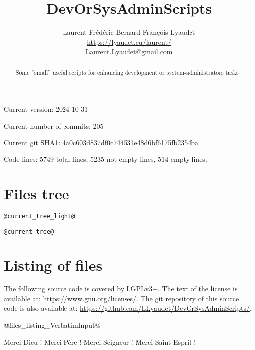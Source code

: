 \documentclass{article}
\begin{document}
\author{
  Laurent Frédéric Bernard François Lyaudet\\
  \url{https://lyaudet.eu/laurent/}\\
  \href{mailto:Laurent.Lyaudet@gmail.com}{Laurent.Lyaudet@gmail.com}
}
\title{DevOrSysAdminScripts}

\maketitle
\begin{abstract}
Some “small” useful scripts
for enhancing development or system-administrators tasks
\end{abstract}

Current version: 2024-10-31

Current number of commits: 205

Current git SHA1: 4a0c603d837df0c744531e48d6bf6175fb2354ba

Code lines: 5749 total lines, 5235 not empty lines, 514 empty lines.

\section{Files tree}
\label{section:tree}

\begin{verbatim}
@current_tree_light@
\end{verbatim}

\begin{verbatim}
@current_tree@
\end{verbatim}

\section{Listing of files}
\label{section:listing}

The following source code is covered by LGPLv3+.
The text of the license is available at:
\url{https://www.gnu.org/licenses/}.
The git repository of this source code is also available at:
\url{https://github.com/LLyaudet/DevOrSysAdminScripts/}.

@files_listing_VerbatimInput@

Merci Dieu !
Merci Père ! Merci Seigneur ! Merci Saint Esprit !
\end{document}
